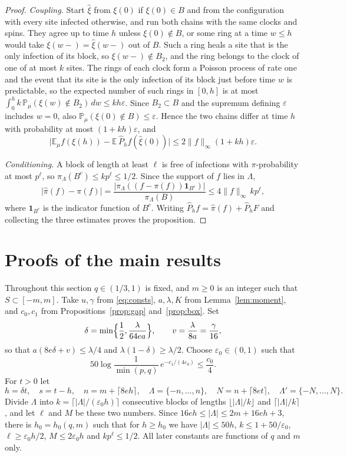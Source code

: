 \documentclass[11pt]{amsart}
\theoremstyle{definition}
\theoremstyle{remark}
\newcommand{\PP}{\mathbb{P}}
\newcommand{\E}{\mathbb{E}}
\begin{document}
\begin{proof}
\emph{Coupling.} Start $\hat\xi$ from $\xi(0)$ if $\xi(0)\in B$ and from the configuration with every site infected
otherwise, and run both chains with the same clocks and spins. They agree up to time $h$ unless $\xi(0)\notin B$, or some
ring at a time $w\le h$ would take $\xi(w-)=\hat\xi(w-)$ out of $B$. Such a ring heals a site that is the only infection
of its block, so $\xi(w-)\notin B_2$, and the ring belongs to the clock of one of at most $k$ sites. The rings of each clock
form a Poisson process of rate one and the event that its site is the only infection of its block just before time $w$ is
predictable, so the expected number of such rings in $[0,h]$ is at most $\int_0^hk\,\PP_\mu(\xi(w)\notin B_2)\,dw\le kh
\varepsilon$. Since $B_2\subset B$ and the supremum defining $\varepsilon$ includes $w=0$, also
$\PP_\mu(\xi(0)\notin B)\le\varepsilon$. Hence the two chains differ at time $h$ with probability at most $(1+kh)\varepsilon$, and
\[
\bigl|\E_\mu f(\xi(h))-\E\,\hat P_hf(\hat\xi(0))\bigr|\le2\|f\|_\infty(1+kh)\varepsilon .
\]

\emph{Conditioning.} A block of length at least $\ell$ is free of infections with $\pi$-probability at most $p^\ell$, so
$\pi_\Lambda(B^c)\le kp^\ell\le1/2$. Since the support of $f$ lies in $\Lambda$,
\[
\bigl|\hat\pi(f)-\pi(f)\bigr|=\frac{|\pi_\Lambda((f-\pi(f))\mathbf 1_{B^c})|}{\pi_\Lambda(B)}\le4\|f\|_\infty\,kp^\ell ,
\]
where $\mathbf 1_{B^c}$ is the indicator function of $B^c$.
Writing $\hat P_hf=\hat\pi(f)+\hat P_hF$ and collecting the three estimates proves the proposition.
\end{proof}

\section{Proofs of the main results}\label{sec:proof}

Throughout this section $q\in(1/3,1)$ is fixed, and $m\ge0$ is an integer such that $S\subset[-m,m]$. Take $u,\gamma$ from \eqref{eq:consts}, $a,\lambda,K$ from
Lemma~\ref{lem:moment}, and $c_0,c_1$ from Propositions~\ref{prop:gap} and~\ref{prop:box}. Set
\[
\delta=\min\Bigl\{\frac12,\frac\lambda{64ea}\Bigr\},\qquad v=\frac\lambda{8a}=\frac\gamma{16},
\]
so that $a(8e\delta+v)\le\lambda/4$ and $\lambda(1-\delta)\ge\lambda/2$. Choose $\varepsilon_0\in(0,1)$ such that
\begin{equation}\label{eq:eps}
50\log\frac1{\min(p,q)}\,e^{-c_1/(4\varepsilon_0)}\le\frac{c_0}4 .
\end{equation}
For $t>0$ let
\[
h=\delta t,\quad s=t-h,\quad n=m+\lceil8eh\rceil,\quad \Lambda=\{-n,\dots,n\},\quad N=n+\lceil8et\rceil,\quad
\Lambda'=\{-N,\dots,N\}.
\]
Divide $\Lambda$ into $k=\lceil|\Lambda|/(\varepsilon_0h)\rceil$ consecutive blocks of lengths $\lfloor|\Lambda|/k\rfloor$
and $\lceil|\Lambda|/k\rceil$, and let $\ell$ and $M$ be these two numbers. Since $16eh\le|\Lambda|\le2m+16eh+3$, there
is $h_0=h_0(q,m)$ such that for $h\ge h_0$ we have $|\Lambda|\le50h$, $k\le1+50/\varepsilon_0$,
$\ell\ge\varepsilon_0h/2$, $M\le2\varepsilon_0h$ and $kp^\ell\le1/2$. All later constants are functions of $q$ and $m$ only.
\end{document}

